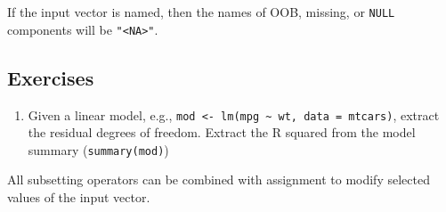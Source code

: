 If the input vector is named, then the names of OOB, missing, or
\texttt{NULL} components will be \texttt{"\textless{}NA\textgreater{}"}.

\subsection{Exercises}

\begin{enumerate}
\def\labelenumi{\arabic{enumi}.}
\itemsep1pt\parskip0pt
\item
  Given a linear model, e.g.,
  \texttt{mod \textless{}- lm(mpg \textasciitilde{} wt, data = mtcars)},
  extract the residual degrees of freedom. Extract the R squared from
  the model summary (\texttt{summary(mod)})
\end{enumerate}


All subsetting operators can be combined with assignment to modify
selected values of the input vector. 

